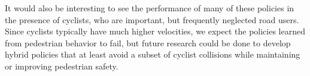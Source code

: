 \documentclass[conference]{IEEEtran}
\begin{document}
It would also be interesting to see the performance of many of these policies in the presence of cyclists, who are important, but frequently neglected road users. Since cyclists typically have much higher velocities, we expect the policies learned from pedestrian behavior to fail, but future research could be done to develop hybrid policies that at least avoid a subset of cyclist collisions while maintaining or improving pedestrian safety.



\end{document}
